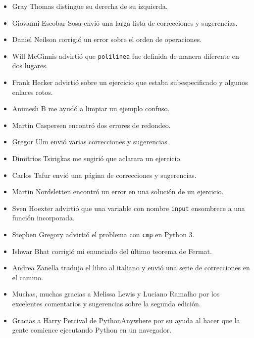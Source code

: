 \documentclass[10pt]{book}
\begin{document}
\begin{itemize}
\item Gray Thomas distingue su derecha de su izquierda.

\item Giovanni Escobar Sosa envió una larga lista de correcciones y
sugerencias.

\item Daniel Neilson corrigió un error sobre el orden de operaciones.

\item Will McGinnis advirtió que {\tt polilinea} fue definida
de manera diferente en dos lugares.

\item Frank Hecker advirtió sobre un ejercicio que estaba subespecificado y
algunos enlaces rotos.

\item Animesh B me ayudó a limpiar un ejemplo confuso.

\item Martin Caspersen encontró dos errores de redondeo.

\item Gregor Ulm envió varias correcciones y sugerencias.

\item Dimitrios Tsirigkas me sugirió que aclarara un ejercicio.

\item Carlos Tafur envió una página de correcciones y sugerencias.

\item Martin Nordsletten encontró un error en una solución de un ejercicio.

\item Sven Hoexter advirtió que una variable con nombre {\tt input}
ensombrece a una función incorporada.

\item Stephen Gregory advirtió el problema con {\tt cmp}
en Python 3.

\item Ishwar Bhat corrigió mi enunciado del último teorema de Fermat.

\item Andrea Zanella tradujo el libro al italiano y envió una
serie de correcciones en el camino.

\item Muchas, muchas gracias a Melissa Lewis y Luciano Ramalho por
  los excelentes comentarios y sugerencias sobre la segunda edición.

\item Gracias a Harry Percival de PythonAnywhere por su ayuda
al hacer que la gente comience ejecutando Python en un navegador.


\end{itemize}
\end{document}
